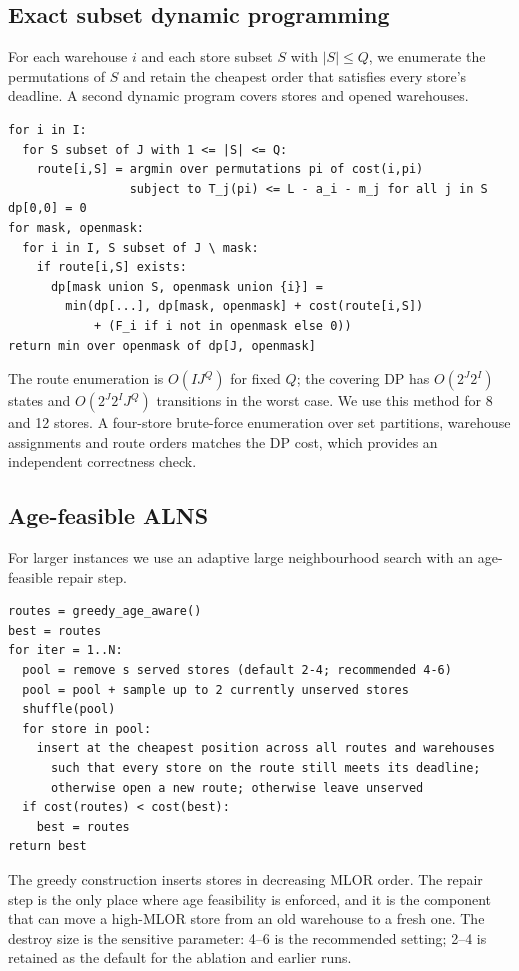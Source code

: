 \documentclass[preprint,12pt]{elsarticle}
\begin{document}
\subsection{Exact subset dynamic programming}

For each warehouse $i$ and each store subset $S$ with $|S|\le Q$, we enumerate the permutations of $S$ and retain the cheapest order that satisfies every store's deadline. A second dynamic program covers stores and opened warehouses.

{\small
\begin{verbatim}
for i in I:
  for S subset of J with 1 <= |S| <= Q:
    route[i,S] = argmin over permutations pi of cost(i,pi)
                 subject to T_j(pi) <= L - a_i - m_j for all j in S
dp[0,0] = 0
for mask, openmask:
  for i in I, S subset of J \ mask:
    if route[i,S] exists:
      dp[mask union S, openmask union {i}] =
        min(dp[...], dp[mask, openmask] + cost(route[i,S])
            + (F_i if i not in openmask else 0))
return min over openmask of dp[J, openmask]
\end{verbatim}
}

The route enumeration is $O(IJ^Q)$ for fixed $Q$; the covering DP has $O(2^J2^I)$ states and $O(2^J2^IJ^Q)$ transitions in the worst case. We use this method for 8 and 12 stores. A four-store brute-force enumeration over set partitions, warehouse assignments and route orders matches the DP cost, which provides an independent correctness check.

\subsection{Age-feasible ALNS}

For larger instances we use an adaptive large neighbourhood search with an age-feasible repair step.

{\small
\begin{verbatim}
routes = greedy_age_aware()
best = routes
for iter = 1..N:
  pool = remove s served stores (default 2-4; recommended 4-6)
  pool = pool + sample up to 2 currently unserved stores
  shuffle(pool)
  for store in pool:
    insert at the cheapest position across all routes and warehouses
      such that every store on the route still meets its deadline;
      otherwise open a new route; otherwise leave unserved
  if cost(routes) < cost(best):
    best = routes
return best
\end{verbatim}
}

The greedy construction inserts stores in decreasing MLOR order. The repair step is the only place where age feasibility is enforced, and it is the component that can move a high-MLOR store from an old warehouse to a fresh one. The destroy size is the sensitive parameter: 4--6 is the recommended setting; 2--4 is retained as the default for the ablation and earlier runs.
\end{document}
